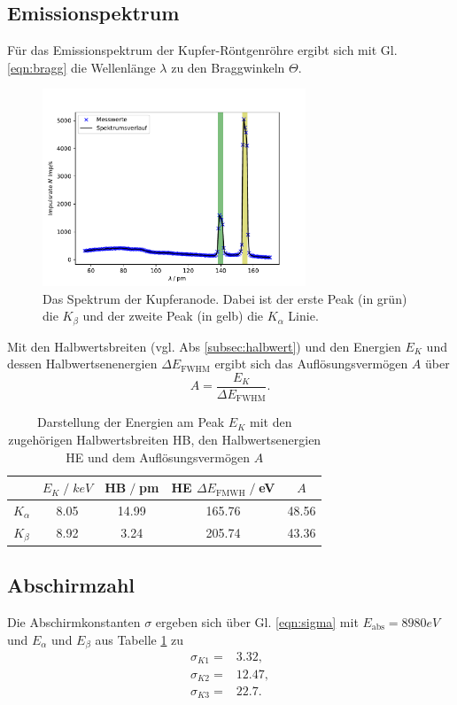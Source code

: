 \subsection{Emissionspektrum}
Für das Emissionspektrum der Kupfer-Röntgenröhre ergibt sich mit Gl. \ref{eqn:bragg} die 
Wellenlänge $\lambda$ zu den Braggwinkeln $\Theta$.
\begin{figure}[H]
    \centering
    \includegraphics[width=0.7\textwidth]{plots/spektrum.pdf}
    \caption{Das Spektrum der Kupferanode. Dabei ist der erste Peak (in grün)
    die $K_{\beta}$ und der zweite Peak (in gelb) die $K_{\alpha}$ 
    Linie.}
    \label{fig:peaks}
\end{figure}
Mit den Halbwertsbreiten (vgl. Abs \ref{subsec:halbwert}) und den Energien $E_K$ und dessen Halbwertsenenergien $\Delta E_{\text{FWHM}}$
ergibt sich das Auflösungsvermögen $A$ über
\begin{equation}
    A=\frac{E_K}{\Delta E_{\text{FWHM}}}.
\end{equation}
\begin{table}[H]
    \centering
    \begin{tabular}{c | c c c c}
        \toprule
        & $E_K\;/\;\si{keV}$ & HB$\;/\;$pm & HE $\Delta E_{\text{FMWH}}\;/\;$eV&$A$\\
        \midrule
        $K_{\alpha}$ & 8.05 & 14.99 & 165.76 &48.56\\
        $K_{\beta}$  & 8.92 & 3.24  & 205.74 &43.36\\
        \bottomrule
    \end{tabular}
    \caption{Darstellung der Energien am Peak $E_K$ mit den zugehörigen Halbwertsbreiten
    HB, den Halbwertsenergien HE und dem Auflösungsvermögen $A$}
    \label{tab:tabelle1}
\end{table}
\subsection{Abschirmzahl}
Die Abschirmkonstanten $\sigma$ ergeben sich über Gl. \ref{eqn:sigma} mit $E_{\text{abs}}=8980\si{eV}$\cite{anleitung}
und $E_{\alpha}$ und $E_{\beta}$ aus Tabelle \ref{tab:tabelle1} zu
\begin{align*}
    \sigma_{K1}=&3.32,\\
    \sigma_{K2}=&12.47,\\
    \sigma_{K3}=&22.7.\\
\end{align*}
